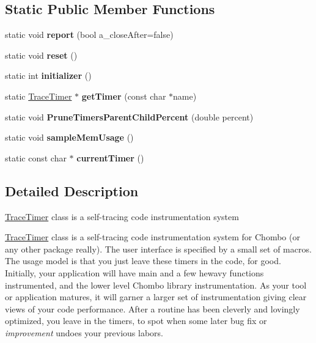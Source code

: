 \subsection*{Static Public Member Functions}
\begin{DoxyCompactItemize}
\item 
\hypertarget{classTraceTimer_a099a00979dce21aa8152189caa9e3664}{}static void {\bfseries report} (bool a\+\_\+close\+After=false)\label{classTraceTimer_a099a00979dce21aa8152189caa9e3664}

\item 
\hypertarget{classTraceTimer_a9c51438e2ce920545955f6b03d1959aa}{}static void {\bfseries reset} ()\label{classTraceTimer_a9c51438e2ce920545955f6b03d1959aa}

\item 
\hypertarget{classTraceTimer_ad2418f864f19ff1af50a7dd86d1ac572}{}static int {\bfseries initializer} ()\label{classTraceTimer_ad2418f864f19ff1af50a7dd86d1ac572}

\item 
\hypertarget{classTraceTimer_a2f3e79338d3f21acc37bcf9a12cc67ae}{}static \hyperlink{classTraceTimer}{Trace\+Timer} $\ast$ {\bfseries get\+Timer} (const char $\ast$name)\label{classTraceTimer_a2f3e79338d3f21acc37bcf9a12cc67ae}

\item 
\hypertarget{classTraceTimer_a5195aa7537a7db853ce2ec8259ad5755}{}static void {\bfseries Prune\+Timers\+Parent\+Child\+Percent} (double percent)\label{classTraceTimer_a5195aa7537a7db853ce2ec8259ad5755}

\item 
\hypertarget{classTraceTimer_af57bb1e97bf05e30a71b09c68bd14370}{}static void {\bfseries sample\+Mem\+Usage} ()\label{classTraceTimer_af57bb1e97bf05e30a71b09c68bd14370}

\item 
\hypertarget{classTraceTimer_a4360f840af3e64a931860d64fb35569f}{}static const char $\ast$ {\bfseries current\+Timer} ()\label{classTraceTimer_a4360f840af3e64a931860d64fb35569f}

\end{DoxyCompactItemize}


\subsection{Detailed Description}
\hyperlink{classTraceTimer}{Trace\+Timer} class is a self-\/tracing code instrumentation system

\hyperlink{classTraceTimer}{Trace\+Timer} class is a self-\/tracing code instrumentation system for Chombo (or any other package really). The user interface is specified by a small set of macros. The usage model is that you just leave these timers in the code, for good. Initially, your application will have \textquotesingle{}main\textquotesingle{} and a few hewavy functions instrumented, and the lower level Chombo library instrumentation. As your tool or application matures, it will garner a larger set of instrumentation giving clear views of your code performance. After a routine has been cleverly and lovingly optimized, you leave in the timers, to spot when some later bug fix or {\itshape improvement} undoes your previous labors.

